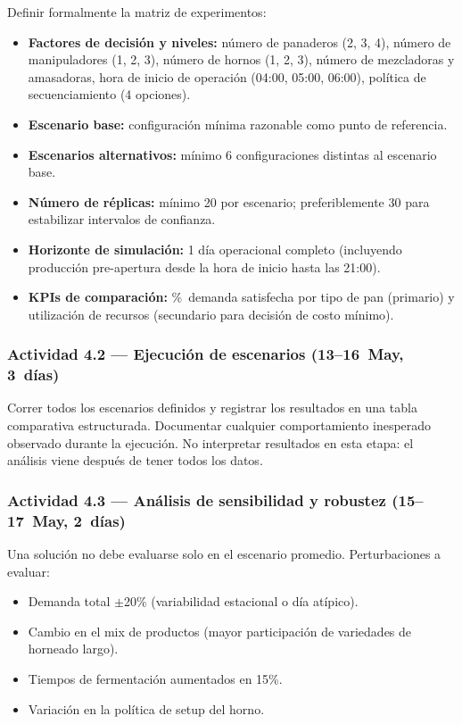 \documentclass[12pt]{article}
\begin{document}
Definir formalmente la matriz de experimentos:
\begin{itemize}
  \item \textbf{Factores de decisión y niveles:} número de panaderos (2, 3, 4), número de manipuladores (1, 2, 3), número de hornos (1, 2, 3), número de mezcladoras y amasadoras, hora de inicio de operación (04:00, 05:00, 06:00), política de secuenciamiento (4 opciones).
  \item \textbf{Escenario base:} configuración mínima razonable como punto de referencia.
  \item \textbf{Escenarios alternativos:} mínimo 6 configuraciones distintas al escenario base.
  \item \textbf{Número de réplicas:} mínimo 20 por escenario; preferiblemente 30 para estabilizar intervalos de confianza.
  \item \textbf{Horizonte de simulación:} 1 día operacional completo (incluyendo producción pre-apertura desde la hora de inicio hasta las 21:00).
  \item \textbf{KPIs de comparación:} \%~demanda satisfecha por tipo de pan (primario) y utilización de recursos (secundario para decisión de costo mínimo).
\end{itemize}

\subsubsection{Actividad 4.2 --- Ejecución de escenarios \quad(13--16~May, 3~días)}

Correr todos los escenarios definidos y registrar los resultados en una tabla comparativa estructurada. Documentar cualquier comportamiento inesperado observado durante la ejecución. No interpretar resultados en esta etapa: el análisis viene después de tener todos los datos.

\subsubsection{Actividad 4.3 --- Análisis de sensibilidad y robustez \quad(15--17~May, 2~días)}

Una solución no debe evaluarse solo en el escenario promedio. Perturbaciones a evaluar:
\begin{itemize}
  \item Demanda total $\pm$20\% (variabilidad estacional o día atípico).
  \item Cambio en el mix de productos (mayor participación de variedades de horneado largo).
  \item Tiempos de fermentación aumentados en 15\%.
  \item Variación en la política de setup del horno.
\end{itemize}
\end{document}
